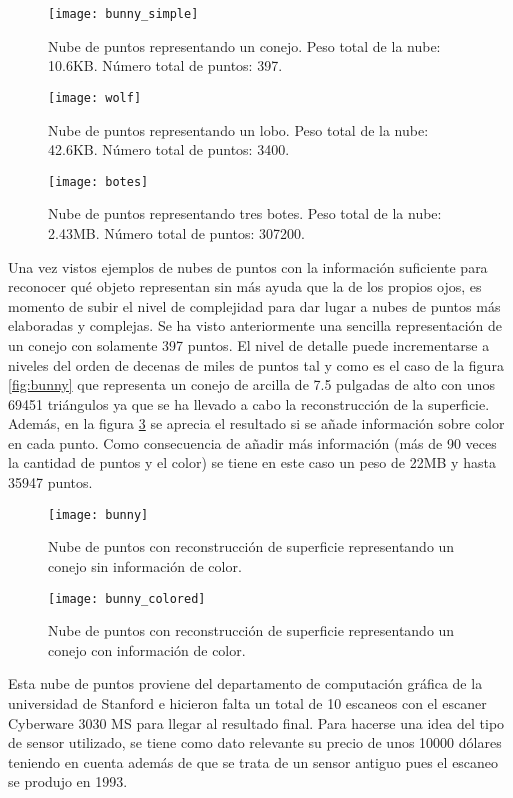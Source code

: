 \begin{figure}[!htb]
  \texttt{[image: bunny\_simple]}
  \caption{Nube de puntos representando un conejo.
  Peso total de la nube: 10.6KB.
  Número total de puntos: 397.}\label{fig:bunny_simple}
\endminipage\hfill
{}
  \texttt{[image: wolf]}
  \caption{Nube de puntos representando un lobo.
  Peso total de la nube: 42.6KB.
  Número total de puntos: 3400.}\label{fig:wolf}
\endminipage\hfill

\end{figure}

\begin{figure}
\centering
\texttt{[image: botes]}
  \caption{Nube de puntos representando tres botes.
  Peso total de la nube: 2.43MB.
  Número total de puntos: 307200.}\label{fig:botes_grande}
\end{figure}



Una vez vistos ejemplos de nubes de puntos con la información suficiente para reconocer qué objeto representan sin más ayuda que la de los propios ojos, es momento de subir el nivel de complejidad para dar lugar a nubes de puntos más elaboradas y complejas. Se ha visto anteriormente una sencilla representación de un conejo con solamente 397 puntos. El nivel de detalle puede incrementarse a niveles del orden de decenas de miles de puntos tal y como es el caso de la figura \ref{fig:bunny} que representa un conejo de arcilla\cite{pcl_conejo_stanford} de 7.5 pulgadas de alto con unos 69451 triángulos ya que se ha llevado a cabo la reconstrucción de la superficie. Además, en la figura \ref{fig:bunny_colored} se aprecia el resultado si se añade información sobre color en cada punto.
Como consecuencia de añadir más información (más de 90 veces la cantidad de puntos y el color) se tiene en este caso un peso de 22MB y hasta 35947 puntos.
\begin{figure}[!htb]
  \texttt{[image: bunny]}
  \caption{Nube de puntos con reconstrucción de superficie representando un conejo sin información de color.}\label{fig:bunny}
\endminipage\hfill
{}
  \texttt{[image: bunny\_colored]}
  \caption{Nube de puntos con reconstrucción de superficie representando un conejo con información de color.}\label{fig:bunny_colored}
\endminipage\hfill
\end{figure}
Esta nube de puntos proviene del departamento de computación gráfica de la universidad de Stanford e hicieron falta un total de 10 escaneos con el escaner Cyberware 3030 MS\cite{escaner_cyberware} para llegar al resultado final. Para hacerse una idea del tipo de sensor utilizado, se tiene como dato relevante su precio de unos 10000 dólares teniendo en cuenta además de que se trata de un sensor antiguo pues el escaneo se produjo en 1993.

